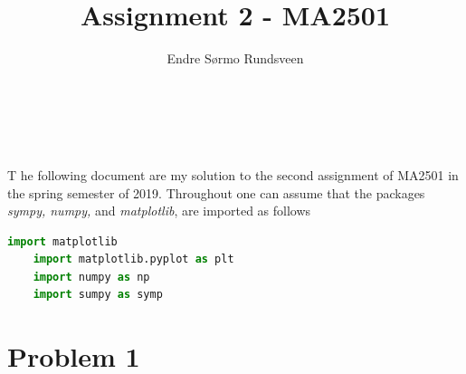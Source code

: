 \documentclass[12pt, a4paper,usenames,dvipsnames]{article}
\title{Assignment 2 - MA2501}
\author{Endre Sørmo Rundsveen}
\begin{document}
\begin{titlepage}
  \centering
    {\noindent \Huge {}}\\
    
    {\large \color{Brown}{Endre Sørmo Rundsveen}}\\
    \raggedright
    \hfill \break
    \lettrine[lraise=0.15]{T}{} he following document are my solution to the second assignment of MA2501 in the spring semester of 2019. Throughout one can assume that the packages \textit{sympy, numpy,} and \textit{matplotlib}, are imported as follows
    \begin{lstlisting}[language=Python]
    import matplotlib
    import matplotlib.pyplot as plt
    import numpy as np
    import sumpy as symp\end{lstlisting}
\end{titlepage}
\restoregeometry
\twocolumn

\section*{Problem 1}
\end{document}
